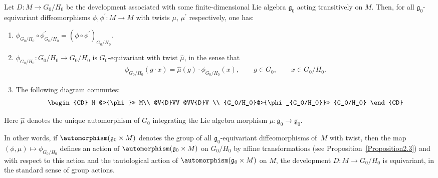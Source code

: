 \begin{PropositionBlaom}\label{Proposition4.7} Let $D \colon M \rightarrow {G_0/H_0}$ be the
  development associated with some finite-di\-men\-sio\-nal Lie algebra
  ${\mathfrak g}_0$ acting transitively on $M$. Then, for all
  ${\mathfrak g}_0$-equivariant diffeomorphisms $\phi,\phi^\prime
  \colon M \rightarrow M$ with twists $\mu$, $\mu^\prime$ respectively,
  one has:
  \begin{enumerate}\itemsep=0pt
  \item[$(1)$] %
  $\phi_{G_0/H_0} \circ \phi^\prime_{G_0/H_0}=(\phi \circ
    \phi^\prime)_{G_0/H_0}$.

  \item[$(2)$] %
  $\phi_{G_0/H_0} \colon {G_0/H_0} \rightarrow
    {G_0/H_0} $ is $G_0$-equivariant with twist $\hat\mu$, in the
    sense that
  \begin{gather*}
    \phi_{G_0/H_0}(g\cdot x)=\hat\mu(g)\cdot \phi_{G_0/H_0}(x), \qquad g
    \in G_0,\qquad x \in {G_0/H_0}.
  \end{gather*}

  \item[$(3)$] %
  The following diagram commutes:
    \begin{gather*}
      \begin{CD}
          M   @>{\phi}>> M\\
          @V{D}VV @VV{D}V \\
          {G_0/H_0}@>{\phi_{G_0/H_0}}>> {G_0/H_0}
        \end{CD}
    \end{gather*}
  \end{enumerate}
   Here $\hat \mu$ denotes the unique automorphism of $G_0$
   integrating the Lie algebra morphism $\mu \colon {\mathfrak g}_0
   \rightarrow {\mathfrak g}_0$.
 \end{PropositionBlaom}

 In other words, if $\automorphism({\mathfrak g}_0 \times M)$ denotes
 the group of all ${\mathfrak g}_0$-equivariant dif\/feomorphisms of~$M$
 with twist, then the map $(\phi,\mu) \mapsto \phi_{G_0/H_0}$ def\/ines
 an action of $\automorphism({\mathfrak g}_0 \times M)$ on ${G_0/H_0}$
 by af\/f\/ine transformations (see Proposition~\ref{Proposition2.3}) %
 and with
 respect to this action and the tautological action of
 $\automorphism({\mathfrak g}_0 \times M)$ on $M$, the development $D
 \colon M \rightarrow {G_0/H_0}$ is equivariant, in the standard sense
 of group actions.


